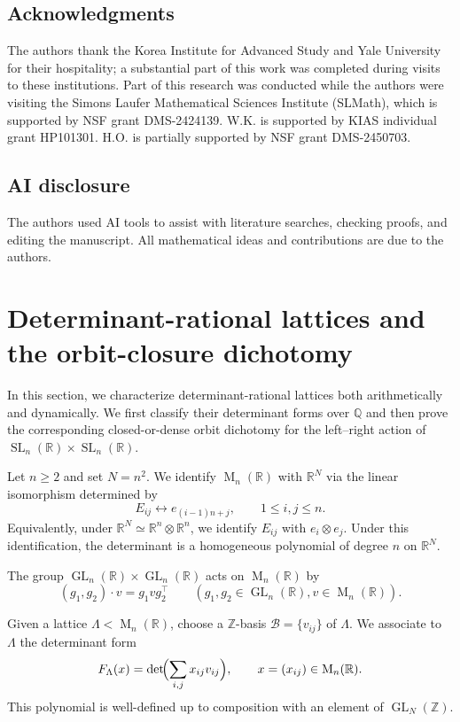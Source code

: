 \documentclass[reqno,11pt]{amsart}
\numberwithin{equation}{section}
\theoremstyle{definition}
\theoremstyle{remark}
\newcommand{\op}{\operatorname}
\newcommand{\br}{\mathbb R}
\newcommand{\M}{\op{M}}
\newcommand{\GL}{\op{GL}}
\newcommand{\SL}{\op{SL}}
\begin{document}
\subsection*{Acknowledgments}
 The authors  thank the Korea Institute for Advanced Study and Yale University for their hospitality;
a substantial part of this work was completed during visits to
these institutions. Part of this research was conducted while the authors were visiting the Simons Laufer Mathematical Sciences Institute (SLMath),  which is supported by NSF grant DMS-2424139. W.K. is supported
by KIAS individual grant HP101301. H.O. is partially supported by NSF grant DMS-2450703.

\subsection*{AI disclosure}
The authors used AI tools to assist with literature searches, checking proofs, and editing the manuscript. All mathematical ideas and contributions are due to the authors.
\section{Determinant-rational lattices and the orbit-closure dichotomy}
\label{s:det-rational}
In this section, we characterize determinant-rational lattices both arithmetically and dynamically. We first classify their determinant forms over $\mathbb Q$ and then prove the corresponding closed-or-dense orbit dichotomy for the left--right action of $\SL_n(\mathbb R)\times \SL_n(\mathbb R)$.

Let $n\ge2$ and set $N=n^2$. We identify $\M_n(\mathbb R)$ with
$\mathbb R^N$ via the linear isomorphism determined by
$$
E_{ij}\longleftrightarrow e_{(i-1)n+j},
\qquad 1\le i,j\le n.
$$
Equivalently, under
$\mathbb R^N\simeq\mathbb R^n\otimes\mathbb R^n$, we identify
$E_{ij}$ with $e_i\otimes e_j$.
Under this identification, the determinant is a homogeneous
polynomial of degree $n$ on $\mathbb R^N$.


The group $\GL_n(\mathbb R)\times \GL_n(\mathbb R)$ acts on
$\M_n(\mathbb R)$ by
\begin{equation}\label{gla}
    (g_1,g_2)\cdot v=g_1vg_2^{\intercal}\qquad(\text{$g_1, g_2\in \GL_n(\br), v\in \M_n(\br)$}).
\end{equation}


Given a lattice $\Lambda<\M_n(\mathbb R)$, choose a $\mathbb Z$-basis
$\mathcal B=\{v_{ij}\}$ of $\Lambda$. We associate to $\Lambda$ the
determinant form
$$
    F_\Lambda(x)=
    \det\!\Bigl(\sum_{i,j}x_{ij}v_{ij}\Bigr),
    \qquad x=(x_{ij})\in\M_n(\mathbb R).
$$
This polynomial is well-defined up to composition with an element of
$\GL_N(\mathbb Z)$. 
\end{document}
